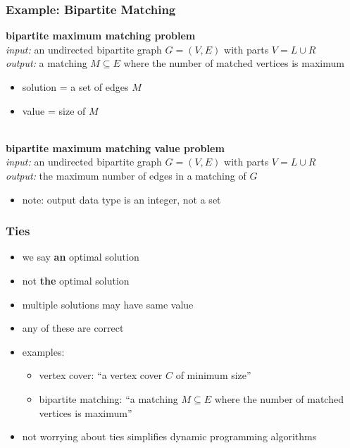 \documentclass[10pt,aspectratio=169]{beamer}
\newcommand{\stanza}{ \\~\ }
\begin{document}
\begin{frame} \frametitle{Example: Bipartite Matching}
  \textbf{bipartite maximum matching problem} \\
  \emph{input:} an undirected bipartite graph $G=(V, E)$ with parts $V=L \cup R$ \\
  \emph{output:} a matching $M \subseteq E$ where the number of matched vertices
    is maximum    
  \begin{itemize}
    \item solution = a set of edges $M$
    \item value = size of $M$ \stanza
  \end{itemize}
  
  \textbf{bipartite maximum matching value problem} \\
  \emph{input:} an undirected bipartite graph $G=(V, E)$ with parts $V=L \cup R$ \\
  \emph{output:} the maximum number of edges in a matching of $G$ 
  \begin{itemize}
    \item note: output data type is an integer, not a set
  \end{itemize}
  \end{frame}
  
\begin{frame} \frametitle{Ties}
  \begin{itemize}
  \item we say \textbf{an} optimal solution
  \item not \textbf{the} optimal solution
  \item multiple solutions may have same value
  \item any of these are correct
  \item examples:
  \begin{itemize}
    \item vertex cover: ``a vertex cover $C$ of minimum size''
    \item bipartite matching: ``a matching $M \subseteq E$ where the number of matched vertices
    is maximum''
  \end{itemize}
  \item not worrying about ties simplifies dynamic programming algorithms
\end{itemize}
\end{frame}
\end{document}

